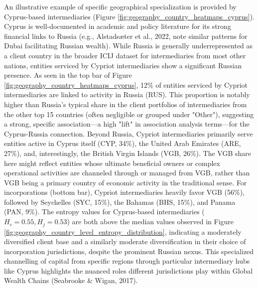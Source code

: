 An illustrative example of specific geographical specialization is provided by Cyprus-based intermediaries (Figure \ref{fig:geography_country_heatmaps_cyprus}). Cyprus is well-documented in academic and policy literature for its strong financial links to Russia (e.g., Alstadsæter et al., 2022, note similar patterns for Dubai facilitating Russian wealth). While Russia is generally underrepresented as a client country in the broader ICIJ dataset for intermediaries from most other nations, entities serviced by Cypriot intermediaries show a significant Russian presence. As seen in the top bar of Figure \ref{fig:geography_country_heatmaps_cyprus}, 12\% of entities serviced by Cypriot intermediaries are linked to activity in Russia (RUS). This proportion is notably higher than Russia's typical share in the client portfolios of intermediaries from the other top 15 countries (often negligible or grouped under "Other"), suggesting a strong, specific association—a high "lift" in association analysis terms—for the Cyprus-Russia connection. Beyond Russia, Cypriot intermediaries primarily serve entities active in Cyprus itself (CYP, 34\%), the United Arab Emirates (ARE, 27\%), and, interestingly, the British Virgin Islands (VGB, 26\%). The VGB share here might reflect entities whose ultimate beneficial owners or complex operational activities are channeled through or managed from VGB, rather than VGB being a primary country of economic activity in the traditional sense. For incorporations (bottom bar), Cypriot intermediaries heavily favor VGB (56\%), followed by Seychelles (SYC, 15\%), the Bahamas (BHS, 15\%), and Panama (PAN, 9\%). The entropy values for Cyprus-based intermediaries ($H_c = 0.55, H_j = 0.53$) are both above the median values observed in Figure \ref{fig:geography_country_level_entropy_distribution}, indicating a moderately diversified client base and a similarly moderate diversification in their choice of incorporation jurisdictions, despite the prominent Russian nexus. This specialized channelling of capital from specific regions through particular intermediary hubs like Cyprus highlights the nuanced roles different jurisdictions play within Global Wealth Chains (Seabrooke \& Wigan, 2017).

